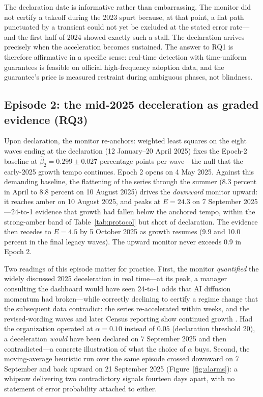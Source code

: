 \documentclass[review,authoryear,12pt]{elsarticle}
\begin{document}
The declaration date is informative rather than embarrassing. The monitor did not certify a takeoff during the 2023 spurt because, at that point, a flat path punctuated by a transient could not yet be excluded at the stated error rate---and the first half of 2024 showed exactly such a stall. The declaration arrives precisely when the acceleration becomes sustained. The answer to RQ1 is therefore affirmative in a specific sense: real-time detection with time-uniform guarantees is feasible on official high-frequency adoption data, and the guarantee's price is measured restraint during ambiguous phases, not blindness.

\subsection{Episode 2: the mid-2025 deceleration as graded evidence (RQ3)}
\label{sec:deceleration}

Upon declaration, the monitor re-anchors: weighted least squares on the eight waves ending at the declaration (12 January--20 April 2025) fixes the Epoch-2 baseline at $\hat{\beta}_2 = 0.299 \pm 0.027$ percentage points per wave---the null that the early-2025 growth tempo continues. Epoch 2 opens on 4 May 2025. Against this demanding baseline, the flattening of the series through the summer (8.3 percent in April to 8.8 percent on 10 August 2025) drives the \emph{downward} monitor upward: it reaches amber on 10 August 2025, and peaks at $E = 24.3$ on 7 September 2025---24-to-1 evidence that growth had fallen below the anchored tempo, within the strong-amber band of Table~\ref{tab:protocol} but short of declaration. The evidence then recedes to $E = 4.5$ by 5 October 2025 as growth resumes (9.9 and 10.0 percent in the final legacy waves). The upward monitor never exceeds 0.9 in Epoch 2.

Two readings of this episode matter for practice. First, the monitor \emph{quantified} the widely discussed 2025 deceleration in real time---at its peak, a manager consulting the dashboard would have seen 24-to-1 odds that AI diffusion momentum had broken---while correctly declining to certify a regime change that the subsequent data contradict: the series re-accelerated within weeks, and the revised-wording waves and later Census reporting show continued growth \citep{censusstory2026}. Had the organization operated at $\alpha = 0.10$ instead of $0.05$ (declaration threshold 20), a deceleration \emph{would} have been declared on 7 September 2025 and then contradicted---a concrete illustration of what the choice of $\alpha$ buys. Second, the moving-average heuristic run over the same episode crossed downward on 7 September and back upward on 21 September 2025 (Figure~\ref{fig:alarms}): a whipsaw delivering two contradictory signals fourteen days apart, with no statement of error probability attached to either.
\end{document}

